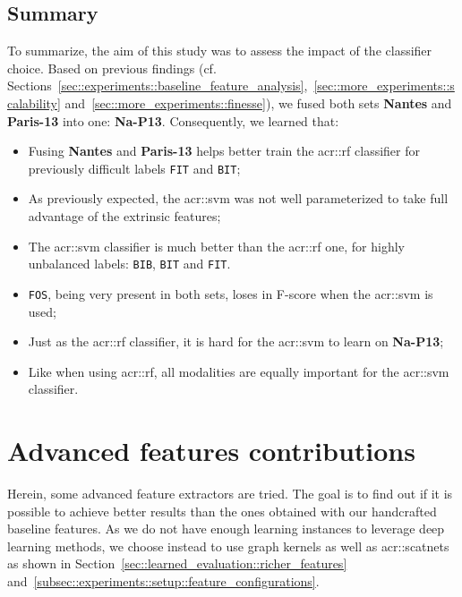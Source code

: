     \subsection{Summary}
        \label{subsec::more_experiments::classifier::summary}
        To summarize, the aim of this study was to assess the impact of the classifier choice.
        Based on previous findings (cf. Sections~\ref{sec::experiments::baseline_feature_analysis},~\ref{sec::more_experiments::scalability} and~\ref{sec::more_experiments::finesse}), we fused both sets \textbf{Nantes} and \textbf{Paris-13} into one: \textbf{Na-P13}.
        Consequently, we learned that:
        \begin{itemize}[label=\(\blacktriangleright\)]
            \item Fusing \textbf{Nantes} and \textbf{Paris-13} helps better train the \gls{acr::rf} classifier for previously difficult labels \texttt{FIT} and \texttt{BIT};
            \item As previously expected, the \gls{acr::svm} was not well parameterized to take full advantage of the extrinsic features;
            \item The \gls{acr::svm} classifier is much better than the \gls{acr::rf} one, for highly unbalanced labels: \texttt{BIB}, \texttt{BIT} and \texttt{FIT}.
            \item \texttt{FOS}, being very present in both sets, loses in F-score when the \gls{acr::svm} is used;
            \item Just as the \gls{acr::rf} classifier, it is hard for the \gls{acr::svm} to learn on \textbf{Na-P13};
            \item Like when using \gls{acr::rf}, all modalities are equally important for the \gls{acr::svm} classifier.
        \end{itemize}


\section{Advanced features contributions}
    \label{sec::more_experiments::richer_features}
    Herein, some advanced feature extractors are tried.
    The goal is to find out if it is possible to achieve better results than the ones obtained with our handcrafted baseline features.
    As we do not have enough learning instances to leverage deep learning methods, we choose instead to use graph kernels as well as \glspl{acr::scatnet} as shown in Section~\ref{sec::learned_evaluation::richer_features} and~\ref{subsec::experiments::setup::feature_configurations}.\\


